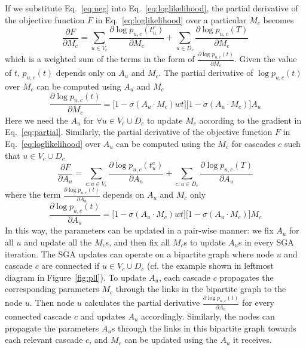If we substitute Eq.~\ref{eq:neg} into Eq.~\ref{eq:loglikelihood}, the partial derivative of the objective function $F$ in Eq.~\ref{eq:loglikelihood} over a particular $M_c$ becomes 
\begin{equation} \label{eq:partial}
    \frac{\partial F}{\partial M_c} =  \sum_{u\in V_c} \frac{\partial \log p_{u,c}(t^c_u) }{\partial M_c} + \sum_{u\in D_c} \frac{\partial \log p_{u,c}(T) }{\partial M_c}
\end{equation}
which is a weighted sum of the terms in the form of $\frac{\partial \log p_{u,c}(t) }{\partial M_c}$. Given the value of $t$, $p_{u,c}(t)$ depends only on $A_u$ and $M_c$. The partial derivative of $\log p_{u,c}(t)$ over $M_c$ can be computed using $A_u$ and $M_c$
\begin{equation} 
    \frac{\partial \log p_{u,c}(t)}{\partial M_c} = \big[1 - \sigma( A_u \cdot M_c) w t\big] \big[1-\sigma( A_u \cdot M_c)\big] A_u
\end{equation}
Here we need the $A_u$ for $\forall u \in V_c \cup D_c$ to update $M_c$ according to the gradient in Eq.~\ref{eq:partial}. Similarly, the partial derivative of the objective function $F$ in Eq.~\ref{eq:loglikelihood} over $A_u$ can be computed using the $M_c$ for cascades $c$ such that $u \in V_c \cup D_c$
\begin{equation}
\frac{\partial F}{\partial A_u} =  {\sum_{c:u\in V_c}} \frac{\partial \log p_{u,c}(t^c_u) }{\partial A_u} + {\sum_{c:u\in D_c}} \frac{\partial \log p_{u,c}(T) }{\partial A_u}
\end{equation}
where the term $\frac{\partial \log p_{u,c}(t)}{\partial A_u}$ depends on $A_u$ and $M_c$ only
\begin{equation} 
    \frac{\partial \log p_{u,c}(t)}{\partial A_u} = \big[1 - \sigma( A_u\cdot M_c) w t\big] \big[1-\sigma( A_u\cdot M_c)\big] M_c
\end{equation}
In this way, the parameters can be updated in a pair-wise manner: we fix $A_u$ for all $u$ and update all the $M_c$s, and then fix all $M_c$s to update $A_u$s in every SGA iteration. The SGA updates can operate on a bipartite graph where node $u$ and cascade $c$ are connected if $u\in V_c \cup D_c$ (cf. the example shown in leftmost diagram in Figure~\ref{fig:pll}). To update $A_{u}$, each cascade $c$ propagates the corresponding parameters $M_c$ through the links in the bipartite graph to the node $u$. Then node $u$ calculates the partial derivative $\frac{\partial \log p_{u,c}(t) }{\partial A_{u}}$ for every connected cascade $c$ and updates $A_{u}$ accordingly. Similarly, the nodes can propagate the parameters $A_u$s through the links in this bipartite graph towards each relevant cascade $c$, and $M_{c}$ can be updated using the $A_u$ it receives. 

